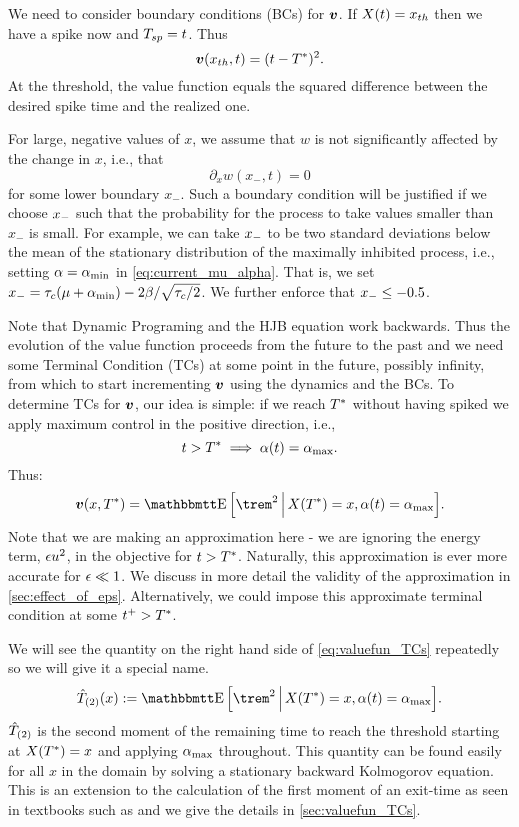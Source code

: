 We need to consider boundary conditions (BCs) for ${ \boldsymbol{v} }$. If $X(t) = { x_{th} }$ then we
have a spike now and $T_{sp} = t$. Thus $$ { \boldsymbol{v} }({ x_{th} },t) = (t-{ T^* })^2.$$ At the
threshold, the value function equals the squared difference between the desired
spike time and the realized one. 

For large, negative values of $x$, we assume that $w$ is not 
significantly affected by the change in $x$, i.e., that $$ \partial_x
w(x_{-}, t) = 0 $$ for some lower boundary $x_{-}$. Such a boundary
condition will be justified if we choose ${ x_{-} }$ such that the probability for the
process to take values smaller than $x_{-}$ is small. For example, we can take ${ x_{-} }$ to be two
standard deviations below the mean of the stationary distribution of the
maximally inhibited process, i.e., setting $\alpha={ \alpha_{\textrm{min}} }$ in
\cref{eq:current_mu_alpha}. That is, we set ${ x_{-} } = \tau_c(\mu + { \alpha_{\textrm{min}} }) - 2 \beta
/ \sqrt{\tau_c/2}$. We further enforce that ${ x_{-} } \leq -0.5$. 

Note that Dynamic Programing and the HJB equation work backwards. Thus the
evolution of the value function proceeds from the future to the past and we need
some Terminal Condition (TCs) at some point in the future, possibly infinity,
from which to start incrementing ${ \boldsymbol{v} }$ using the dynamics and the BCs. To
determine TCs for ${ \boldsymbol{v} }$, our idea is simple: if we reach ${ T^* }$ without having
spiked we apply maximum control in the positive direction, i.e., 
$$t>{ T^* } \implies \alpha(t) = { \alpha_{\textrm{max}} }.$$ Thus: \begin{equation}\v(x,\T) = \Exp
\Big[\trem^2 \,\Big|\, X(\T) = x, \a(t) = \amax \Big].
\label{eq:valuefun_TCs}
\end{equation}
Note that we are making an approximation here
- we are ignoring the energy term, ${\epsilon} u^2$, in the objective for
$t>{ T^* }$. Naturally, this approximation is ever more accurate for ${\epsilon} \ll 1$.
We discuss in more detail the validity of the approximation in
\cref{sec:effect_of_eps}.
Alternatively, we could impose this approximate terminal condition at some $t^+
> { T^* }$.

We will see the quantity on the right hand side of \cref{eq:valuefun_TCs}
repeatedly so we will give it a special name.
\begin{equation}
\Ttwo(x) := \Exp \Big[\trem^2 \,\Big|\, X(\T) = x, \a(t) = \amax \Big].
\label{eq:Trem_squared}
\end{equation}
${ \hat{T}_{(2)} }$ is the second moment of the remaining time to reach the
threshold starting at $X({ T^* }) = x$ and applying ${ \alpha_{\textrm{max}} }$ throughout. This quantity
can be found easily for all $x$ in the domain by solving a stationary backward Kolmogorov
equation. This is an extension to the calculation of the first moment of an
exit-time as seen in textbooks such as \cite{Jacobs} and we give the
details in \ref{sec:valuefun_TCs}.

